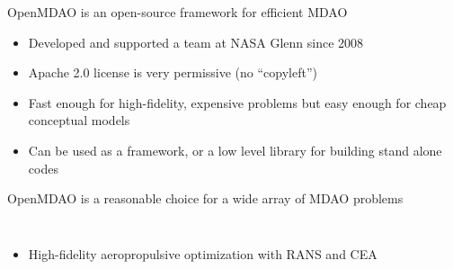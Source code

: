 \documentclass[aspectratio=169, usenames,dvipsnames, 14pt]{beamer}
\begin{document}
\begin{frame}{OpenMDAO is an open-source framework for efficient MDAO}
    \begin{itemize}
        \item Developed and supported a team at NASA Glenn since 2008
        \vspace{0.5cm}
        \item Apache 2.0 license is very permissive (no “copyleft”)
        \vspace{0.5cm}
        \item Fast enough for high-fidelity, expensive problems but easy enough for cheap conceptual models
        \vspace{0.5cm}
        \item Can be used as a framework, or a low level library for building stand alone codes
    \end{itemize}
    
\end{frame}

\begin{frame}{OpenMDAO is a reasonable choice for a wide array of MDAO problems}
    \begin{columns}
    
            \begin{itemize}
                \item High-fidelity aeropropulsive optimization with RANS and CEA
                
                
            \end{itemize}
        
            
            
    \end{columns}
\end{frame}
\end{document}
